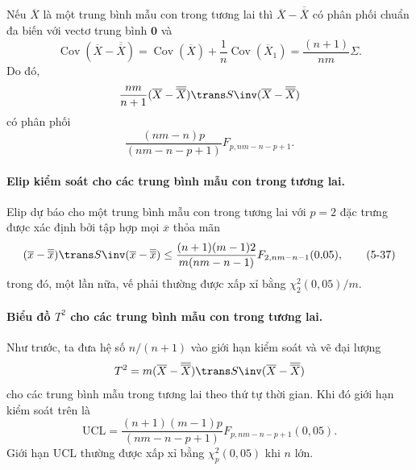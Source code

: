 Nếu $\overline{X}$ là một trung bình mẫu con trong tương lai thì $\overline{X}-\overline{\overline{X}}$ có phân phối chuẩn đa biến với vectơ trung bình $\mathbf{0}$ và
\begin{equation*}
    \operatorname{Cov}(\overline{X}-\overline{\overline{X}}) = \operatorname{Cov}(\overline{X}) + \frac{1}{n}\operatorname{Cov}(\overline{X}_{1}) = \frac{(n+1)}{nm}\Sigma.
\end{equation*}
Do đó,
\begin{equation*}
    \frac{nm}{n+1}(\overline{X}-\overline{\overline{X}})\trans S\inv(\overline{X}-\overline{\overline{X}})
\end{equation*}
có phân phối
\begin{equation*}
    \frac{(nm-n)p}{(nm-n-p+1)}F_{p, nm-n-p+1}.
\end{equation*}

\paragraph{Elip kiểm soát cho các trung bình mẫu con trong tương lai.} Elip dự báo cho một trung bình mẫu con trong tương lai với $p=2$ đặc trưng được xác định bởi tập hợp mọi $\overline{x}$ thỏa mãn
\begin{equation}
    (\overline{x}-\overline{\overline{x}})\trans S\inv(\overline{x}-\overline{\overline{x}}) \le \frac{(n+1)(m-1)2}{m(nm-n-1)}F_{2, nm-n-1}(0{,}05),
    \tag{5-37}
    \label{eq:5-37}
\end{equation}
trong đó, một lần nữa, vế phải thường được xấp xỉ bằng $\chi_{2}^{2}(0{,}05)/m$.

\paragraph{Biểu đồ $T^{2}$ cho các trung bình mẫu con trong tương lai.} Như trước, ta đưa hệ số $n/(n+1)$ vào giới hạn kiểm soát và vẽ đại lượng
\begin{equation*}
    T^{2} = m(\overline{X}-\overline{\overline{X}})\trans S\inv(\overline{X}-\overline{\overline{X}})
\end{equation*}
cho các trung bình mẫu trong tương lai theo thứ tự thời gian. Khi đó giới hạn kiểm soát trên là
\begin{equation*}
    \mathrm{UCL} = \frac{(n+1)(m-1)p}{(nm-n-p+1)}F_{p, nm-n-p+1}(0{,}05).
\end{equation*}
Giới hạn $\mathrm{UCL}$ thường được xấp xỉ bằng $\chi_{p}^{2}(0{,}05)$ khi $n$ lớn.

